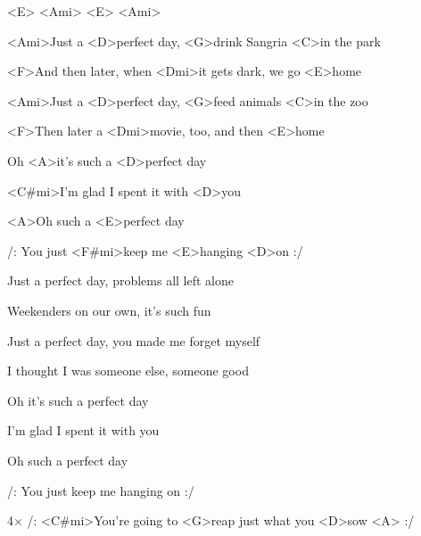 



<E> <Ami> <E> <Ami>

\zs

<Ami>Just a <D>perfect day,
<G>drink Sangria <C>in the park

<F>And then later, when <Dmi>it gets dark,
we go <E>home

<Ami>Just a <D>perfect day,
<G>feed animals <C>in the zoo

<F>Then later a <Dmi>movie, too,
and then <E>home

\bigskip

Oh <A>it's such a <D>perfect day

<C#mi>I'm glad I spent it with <D>you

<A>Oh such a <E>perfect day

/: You just <F#mi>keep me <E>hanging <D>on :/
\ks


\zs
Just a perfect day,
problems all left alone

Weekenders on our own,
it's such fun

Just a perfect day,
you made me forget myself

I thought I was someone else,
someone good

\bigskip

Oh it's such a perfect day

I'm glad I spent it with you

Oh such a perfect day

/: You just keep me hanging on :/
\ks


4× /:
<C#mi>You're going to <G>reap just what you <D>sow <A>
:/


\kp



